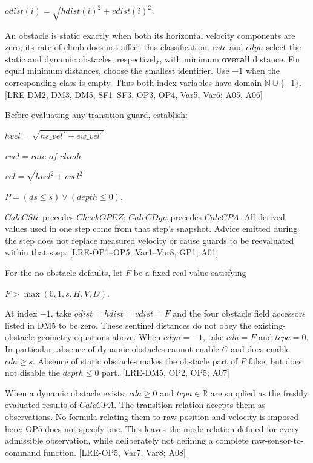 \documentclass[10pt,a4paper]{article}
\begin{document}
$\mathit{odist}(\mathit{i}) = \sqrt{\mathit{hdist}(\mathit{i})^{2} + \mathit{vdist}(\mathit{i})^{2}}$.

An obstacle is static exactly when both its horizontal velocity components are zero; its rate of climb does not affect this classification. $\mathit{cstc}$ and $\mathit{cdyn}$ select the static and dynamic obstacles, respectively, with minimum \textbf{overall} distance. For equal minimum distances, choose the smallest identifier. Use $-1$ when the corresponding class is empty. Thus both index variables have domain $\mathbb{N} \cup  \{-1\}$. [LRE-DM2, DM3, DM5, SF1--SF3, OP3, OP4, Var5, Var6; A05, A06]

Before evaluating any transition guard, establish:

$\mathit{hvel} = \sqrt{\mathit{ns\_vel}^{2} + \mathit{ew\_vel}^{2}}$

$\mathit{vvel} = \mathit{rate\_of\_climb}$

$\mathit{vel} = \sqrt{\mathit{hvel}^{2} + \mathit{vvel}^{2}}$

$\mathit{P} = (\mathit{ds} \le  \mathit{s}) \lor  (\mathit{depth} \le  0)$.

$\mathit{CalcCStc}$ precedes $\mathit{CheckOPEZ}$; $\mathit{CalcCDyn}$ precedes $\mathit{CalcCPA}$. All derived values used in one step come from that step's snapshot. Advice emitted during the step does not replace measured velocity or cause guards to be reevaluated within that step. [LRE-OP1--OP5, Var1--Var8, GP1; A01]

For the no-obstacle defaults, let $\mathit{F}$ be a fixed real value satisfying

$\mathit{F} > \max(0, 1, \mathit{s}, \mathit{H}, \mathit{V}, \mathit{D})$.

At index $-1$, take $\mathit{odist} = \mathit{hdist} = \mathit{vdist} = \mathit{F}$ and the four obstacle field accessors listed in DM5 to be zero. These sentinel distances do not obey the existing-obstacle geometry equations above. When $\mathit{cdyn} = -1$, take $\mathit{cda} = \mathit{F}$ and $\mathit{tcpa} = 0$. In particular, absence of dynamic obstacles cannot enable $\mathit{C}$ and does enable $\mathit{cda} \ge  \mathit{s}$. Absence of static obstacles makes the obstacle part of $\mathit{P}$ false, but does not disable the $\mathit{depth} \le  0$ part. [LRE-DM5, OP2, OP5; A07]

When a dynamic obstacle exists, $\mathit{cda} \ge  0$ and $\mathit{tcpa} \in  \mathbb{R}$ are supplied as the freshly evaluated results of $\mathit{CalcCPA}$. The transition relation accepts them as observations. No formula relating them to raw position and velocity is imposed here: OP5 does not specify one. This leaves the mode relation defined for every admissible observation, while deliberately not defining a complete raw-sensor-to-command function. [LRE-OP5, Var7, Var8; A08]
\end{document}
